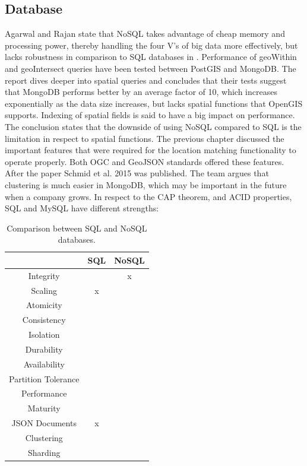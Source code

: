 \subsection{Database}
Agarwal and Rajan state that NoSQL takes advantage of cheap memory and processing power, thereby handling the four V’s of big data more effectively, but lacks robustness in comparison to SQL databases in \cite{AGS}. Performance of geoWithin and geoIntersect queries have been tested between PostGIS and MongoDB. The report dives deeper into spatial queries and concludes that their tests suggest that MongoDB performs better by an average factor of 10, which increases exponentially as the data size increases, but lacks spatial functions that OpenGIS supports. Indexing of spatial fields is said to have a big impact on performance. The conclusion states that the downside of using NoSQL compared to SQL is the limitation in respect to spatial functions. The previous chapter discussed the important features that were required for the location matching functionality to operate properly. Both OGC and GeoJSON standards offered these features. After the paper Schmid et al. 2015 \cite{SCS} was published. The team argues that clustering is much easier in MongoDB, which may be important in the future when a company grows. In respect to the CAP theorem, and ACID properties, SQL and MySQL have different strengths:

\begin{table}[htbp!]
	\centering
	\begin{tabular}{c|c|c}
		\toprule
		& SQL & NoSQL \\
		\midrule
		Integrity & \checkmark\checkmark & x \\
		Scaling & x & \checkmark\checkmark \\
		Atomicity & \checkmark & \checkmark \\
		Consistency & \checkmark\checkmark & \checkmark \\
		Isolation & \checkmark & \checkmark \\
		Durability & \checkmark & \checkmark \\
		Availability & \checkmark & \checkmark\checkmark \\
		Partition Tolerance & \checkmark & \checkmark \\
		Performance & \checkmark & \checkmark\checkmark \\
		Maturity & \checkmark\checkmark & \checkmark \\
		JSON Documents & x & \checkmark \\
		Clustering & \checkmark & \checkmark \\
		Sharding & \checkmark & \checkmark\checkmark \\
		\bottomrule
	\end{tabular}
	\caption[Databases Comparison]{Comparison between SQL and NoSQL databases.}
	\label{tab:databases-comparison}
\end{table}

